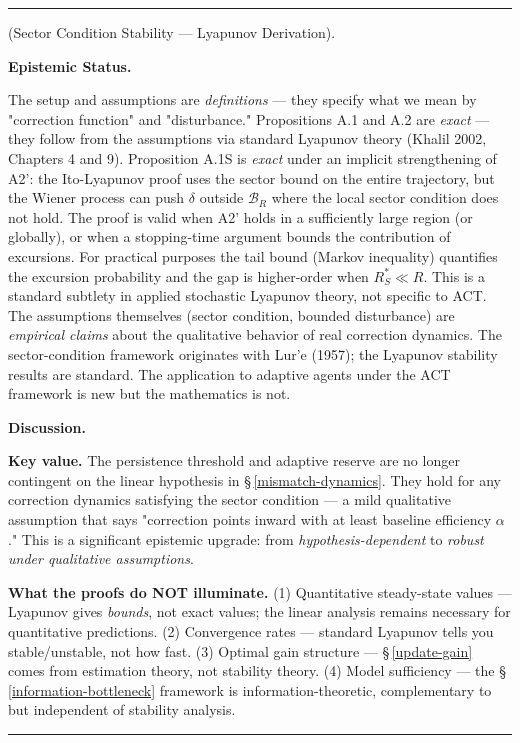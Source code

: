 \documentclass[11pt,oneside]{article}
\newcounter{claim}[section]
\renewcommand{\theclaim}{\thesection.\arabic{claim}}
\newenvironment{segment}[2]{%
  \refstepcounter{claim}%
  \bigskip\noindent\hrule\smallskip
  \noindent{\bfseries #1~\theclaim}\enskip(#2).\par\smallskip
  \noindent\ignorespaces
}{%
  \par\smallskip\noindent\hrule\bigskip
}
\newenvironment{derivation}[1][]{\begin{segment}{Derivation}{#1}}{\end{segment}}
\begin{document}
\begin{derivation}[Sector Condition Stability — Lyapunov Derivation]
\medskip\noindent\textbf{Epistemic Status.}


The setup and assumptions are \textit{definitions} — they specify what we mean by "correction function" and "disturbance." Propositions A.1 and A.2 are \textit{exact} — they follow from the assumptions via standard Lyapunov theory (Khalil 2002, Chapters 4 and 9). Proposition A.1S is \textit{exact} under an implicit strengthening of A2': the Ito-Lyapunov proof uses the sector bound on the entire trajectory, but the Wiener process can push $\delta$ outside $\mathcal B_R$ where the local sector condition does not hold. The proof is valid when A2' holds in a sufficiently large region (or globally), or when a stopping-time argument bounds the contribution of excursions. For practical purposes the tail bound (Markov inequality) quantifies the excursion probability and the gap is higher-order when $R^*_S \ll R$. This is a standard subtlety in applied stochastic Lyapunov theory, not specific to ACT. The assumptions themselves (sector condition, bounded disturbance) are \textit{empirical claims} about the qualitative behavior of real correction dynamics. The sector-condition framework originates with Lur'e (1957); the Lyapunov stability results are standard. The application to adaptive agents under the ACT framework is new but the mathematics is not.


\medskip\noindent\textbf{Discussion.}


\textbf{Key value.} The persistence threshold and adaptive reserve are no longer contingent on the linear hypothesis in \S\,\ref{mismatch-dynamics}. They hold for any correction dynamics satisfying the sector condition — a mild qualitative assumption that says "correction points inward with at least baseline efficiency $\alpha$." This is a significant epistemic upgrade: from \textit{hypothesis-dependent} to \textit{robust under qualitative assumptions}.

\textbf{What the proofs do NOT illuminate.} (1) Quantitative steady-state values — Lyapunov gives \textit{bounds}, not exact values; the linear analysis remains necessary for quantitative predictions. (2) Convergence rates — standard Lyapunov tells you stable/unstable, not how fast. (3) Optimal gain structure — \S\,\ref{update-gain} comes from estimation theory, not stability theory. (4) Model sufficiency — the \S\,\ref{information-bottleneck} framework is information-theoretic, complementary to but independent of stability analysis.


\end{derivation}
\end{document}

